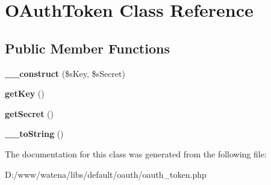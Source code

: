 \hypertarget{class_o_auth_token}{\section{O\-Auth\-Token Class Reference}
\label{class_o_auth_token}
}
\subsection*{Public Member Functions}
\begin{DoxyCompactItemize}
\item 
\hypertarget{class_o_auth_token_a75ea1e56d9d5f469b9590aa12d9ae14d}{{\bfseries \-\_\-\-\_\-construct} (\$s\-Key, \$s\-Secret)}\label{class_o_auth_token_a75ea1e56d9d5f469b9590aa12d9ae14d}

\item 
\hypertarget{class_o_auth_token_ae4eb4c69c2dc8e348cef1d7b64445e39}{{\bfseries get\-Key} ()}\label{class_o_auth_token_ae4eb4c69c2dc8e348cef1d7b64445e39}

\item 
\hypertarget{class_o_auth_token_a4651de28a2845518129222ab8602cb24}{{\bfseries get\-Secret} ()}\label{class_o_auth_token_a4651de28a2845518129222ab8602cb24}

\item 
\hypertarget{class_o_auth_token_ac520ac40ac7ba6f96ab080a7d2d928b5}{{\bfseries \-\_\-\-\_\-to\-String} ()}\label{class_o_auth_token_ac520ac40ac7ba6f96ab080a7d2d928b5}

\end{DoxyCompactItemize}


The documentation for this class was generated from the following file\-:\begin{DoxyCompactItemize}
\item 
D\-:/www/watena/libs/default/oauth/oauth\-\_\-token.\-php\end{DoxyCompactItemize}
